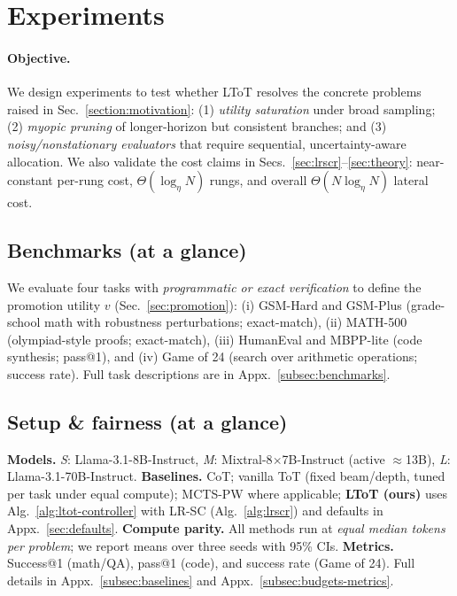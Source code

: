 \documentclass{article}
\begin{document}
\section{Experiments}
\label{section:experiments}

\paragraph{Objective.}
We design experiments to test whether LToT resolves the concrete problems raised in Sec.~\ref{section:motivation}:
(1) \emph{utility saturation} under broad sampling; (2) \emph{myopic pruning} of longer-horizon but consistent branches; and
(3) \emph{noisy/nonstationary evaluators} that require sequential, uncertainty-aware allocation.
We also validate the cost claims in Secs.~\ref{sec:lrscr}--\ref{sec:theory}:
near-constant per-rung cost, $\Theta(\log_\eta N)$ rungs, and overall $\Theta(N\log_\eta N)$ lateral cost.



\subsection{Benchmarks (at a glance)}\label{subsec:benchmarks-glance}
We evaluate four tasks with \emph{programmatic or exact verification} to define the promotion utility $v$ (Sec.~\ref{sec:promotion}): (i) GSM-Hard and GSM-Plus (grade-school math with robustness perturbations; exact-match), (ii) MATH-500 (olympiad-style proofs; exact-match), (iii) HumanEval and MBPP-lite (code synthesis; pass@1), and (iv) Game of 24 (search over arithmetic operations; success rate). Full task descriptions are in Appx.~\ref{subsec:benchmarks}.


\subsection{Setup \& fairness (at a glance)}\label{subsec:setup-glance}
\textbf{Models.} \emph{S}: Llama-3.1-8B-Instruct, \emph{M}: Mixtral-8$\times$7B-Instruct (active $\approx$13B), \emph{L}: Llama-3.1-70B-Instruct.
\textbf{Baselines.} CoT; vanilla ToT (fixed beam/depth, tuned per task under equal compute); MCTS-PW where applicable; \textbf{LToT (ours)} uses Alg.~\ref{alg:ltot-controller} with LR-SC (Alg.~\ref{alg:lrscr}) and defaults in Appx.~\ref{sec:defaults}.
\textbf{Compute parity.} All methods run at \emph{equal median tokens per problem}; we report means over three seeds with 95\% CIs.
\textbf{Metrics.} Success@1 (math/QA), pass@1 (code), and success rate (Game of 24).
Full details in Appx.~\ref{subsec:baselines} and Appx.~\ref{subsec:budgets-metrics}.
\end{document}
